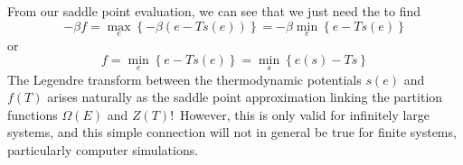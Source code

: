 \documentclass[a4paper,twoside,master.tex]{subfiles}
\begin{document}
From our saddle point evaluation, we can see that we just need the to find
\begin{equation}
    - \beta f = \max_{e} \left\{ - \beta (e - T s(e)) \right\} = - \beta \min_e \left\{ e - T s(e) \right\}
\end{equation}
or
\begin{equation}
    f = \min_e \left\{ e - T s(e) \right\} = \min_{s} \left\{ e(s) - Ts \right\}
\end{equation}
The Legendre transform between the thermodynamic potentials $ s(e) $ and $ f(T) $ arises naturally as the saddle point approximation linking the partition functions $ \Omega(E) $ and $ Z(T) $!\ However, this is only valid for infinitely large systems, and this simple connection will not in general be true for finite systems, particularly computer simulations.
\end{document}
